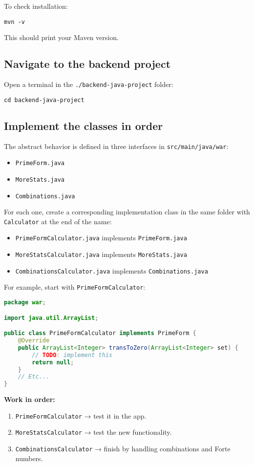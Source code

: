 \documentclass[11pt,letterpaper]{article}
\newcommand{\code}[1]{\texttt{\small #1}}
\begin{document}
To check installation:
\begin{lstlisting}
mvn -v
\end{lstlisting}
This should print your Maven version.

\subsection{Navigate to the backend project}
Open a terminal in the \code{./backend-java-project} folder:
\begin{lstlisting}
cd backend-java-project
\end{lstlisting}

\subsection{Implement the classes in order}
The abstract behavior is defined in three interfaces in \code{src/main/java/war}:
\begin{itemize}[leftmargin=*]
    \item \code{PrimeForm.java}
    \item \code{MoreStats.java}
    \item \code{Combinations.java}
\end{itemize}

For each one, create a corresponding implementation class in the same folder with \code{Calculator} at the end of the name:
\begin{itemize}[leftmargin=*]
    \item \code{PrimeFormCalculator.java} implements \code{PrimeForm.java}
    \item \code{MoreStatsCalculator.java} implements \code{MoreStats.java}
    \item \code{CombinationsCalculator.java} implements \code{Combinations.java}
\end{itemize}

For example, start with \code{PrimeFormCalculator}:

\begin{lstlisting}[language=Java]
package war;

import java.util.ArrayList;

public class PrimeFormCalculator implements PrimeForm {
    @Override
    public ArrayList<Integer> transToZero(ArrayList<Integer> set) {
        // TODO: implement this
        return null;
    }
    // Etc...
}
\end{lstlisting}
\newpage
\textbf{Work in order:}
\begin{enumerate}[leftmargin=*]
    \item \code{PrimeFormCalculator} → test it in the app.
    \item \code{MoreStatsCalculator} → test the new functionality.
    \item \code{CombinationsCalculator} → finish by handling combinations and Forte numbers.
\end{enumerate}
\end{document}
